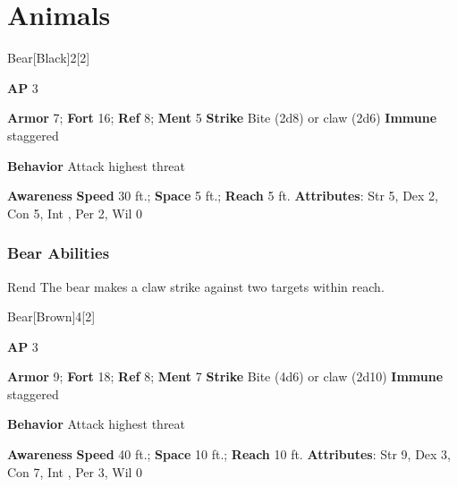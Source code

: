 \section{Animals}
\begin{monsection}{Bear}[Black]{2}[2]
\vspace{-1em}\vspace{-1em}
\begin{spellcontent}
\begin{spelltargetinginfo}
{\textbf{AP} 3}

\pari \textbf{Armor} 7;
\textbf{Fort} 16;
\textbf{Ref} 8;
\textbf{Ment} 5
\pari \textbf{Strike} Bite  (2d8) or claw  (2d6)
\pari \textbf{Immune} staggered


\pari \textbf{Behavior} Attack highest threat
\end{spelltargetinginfo}
\end{spellcontent}

\begin{monsterfooter}
\pari \textbf{Awareness} 
\pari \textbf{Speed} 30 ft.;
\textbf{Space} 5 ft.;
\textbf{Reach} 5 ft.
\pari \textbf{Attributes}:
Str 5,
Dex 2,
Con 5,
Int ,
Per 2,
Wil 0
\end{monsterfooter}
\end{monsection}


\subsubsection{Bear Abilities}

\begin{freeability}{Rend}
The bear makes a claw strike against two targets within reach.
\end{freeability}

\begin{monsection}{Bear}[Brown]{4}[2]
\vspace{-1em}\vspace{-1em}
\begin{spellcontent}
\begin{spelltargetinginfo}
{\textbf{AP} 3}

\pari \textbf{Armor} 9;
\textbf{Fort} 18;
\textbf{Ref} 8;
\textbf{Ment} 7
\pari \textbf{Strike} Bite  (4d6) or claw  (2d10)
\pari \textbf{Immune} staggered


\pari \textbf{Behavior} Attack highest threat
\end{spelltargetinginfo}
\end{spellcontent}

\begin{monsterfooter}
\pari \textbf{Awareness} 
\pari \textbf{Speed} 40 ft.;
\textbf{Space} 10 ft.;
\textbf{Reach} 10 ft.
\pari \textbf{Attributes}:
Str 9,
Dex 3,
Con 7,
Int ,
Per 3,
Wil 0
\end{monsterfooter}
\end{monsection}


